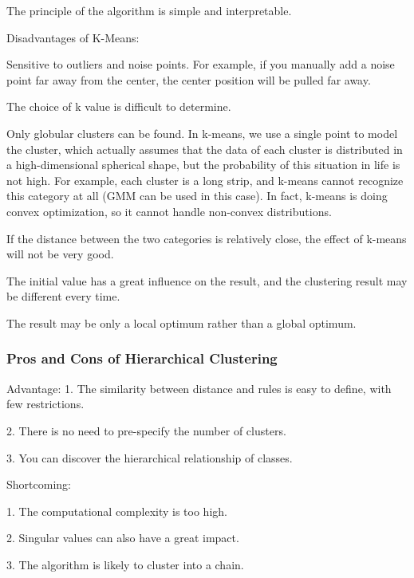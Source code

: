 \documentclass[11pt]{report}
\begin{document}
The principle of the algorithm is simple and interpretable.

Disadvantages of K-Means: 

Sensitive to outliers and noise points. For example, if you manually add a noise point far away from the center, the center position will be pulled far away.

The choice of k value is difficult to determine.

Only globular clusters can be found. In k-means, we use a single point to model the cluster, which actually assumes that the data of each cluster is distributed in a high-dimensional spherical shape, but the probability of this situation in life is not high. For example, each cluster is a long strip, and k-means cannot recognize this category at all (GMM can be used in this case). In fact, k-means is doing convex optimization, so it cannot handle non-convex distributions.

If the distance between the two categories is relatively close, the effect of k-means will not be very good.

The initial value has a great influence on the result, and the clustering result may be different every time.

The result may be only a local optimum rather than a global optimum.

\subsubsection{Pros and Cons of Hierarchical Clustering}
Advantage:
1. The similarity between distance and rules is easy to define, with few restrictions.

2. There is no need to pre-specify the number of clusters.

3. You can discover the hierarchical relationship of classes.

Shortcoming:

1. The computational complexity is too high.

2. Singular values can also have a great impact.

3. The algorithm is likely to cluster into a chain.
\end{document}

